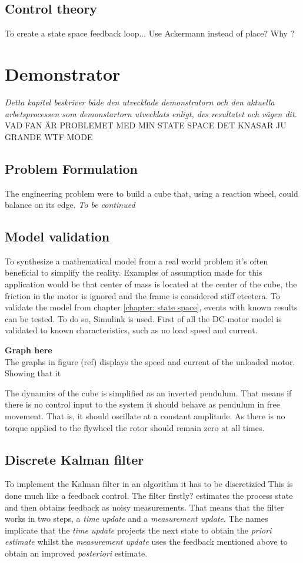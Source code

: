 \documentclass[a4paper,11pt]{kth-mag}
\begin{document}
\section{Control theory}
To create a state space feedback loop...
Use Ackermann instead of place? Why ?
 
\chapter{Demonstrator}
\emph{Detta kapitel beskriver både den utvecklade demonstratorn och den aktuella arbetsprocessen som demonstartorn utvecklats enligt, dvs resultatet och vägen dit.}
VAD FAN ÄR PROBLEMET MED MIN STATE SPACE DET KNASAR JU GRANDE WTF MODE

\section{Problem Formulation}

The engineering problem were to build a cube that, using a reaction wheel, could balance on its edge.
\emph{To be continued}


\section{Model validation}
To synthesize a mathematical model from a real world problem it's often beneficial to simplify the reality. Examples of assumption made for this application would be that center of mass is located at the center of the cube, the friction in the motor is ignored and the frame is considered stiff etcetera. 
To validate the model from chapter \ref{chapter: state space}, events with known results can be tested. To do so, Simulink \cite{MATLAB:2014} is used.
First of all the DC-motor model is validated to known characteristics, such as no load speed and current. 

\textbf{Graph here}
\\
The graphs in figure (ref) displays the speed and current of the unloaded motor. Showing that it   

The dynamics of the cube is simplified as an inverted pendulum. That means if there is no control input to the system it should behave as pendulum in free movement. That is, it should oscillate at a constant amplitude. As there is no torque applied to the flywheel the rotor should remain zero at all times. 
\section{Discrete Kalman filter} \label{sec: discrete kalman}
To implement the Kalman filter in an algorithm it has to be discretizied 
This is done much like a feedback control. The filter firstly? estimates the process state and then obtains feedback as noisy measurements. That means that the filter works in two steps, a \textit{time update} and a \textit{measurement update}. The names implicate that the \textit{time update} projects the next state to obtain the \textit{priori estimate} whilst the \textit{measurement update} uses the feedback mentioned above to obtain an improved \textit{posteriori} estimate.
\end{document}
